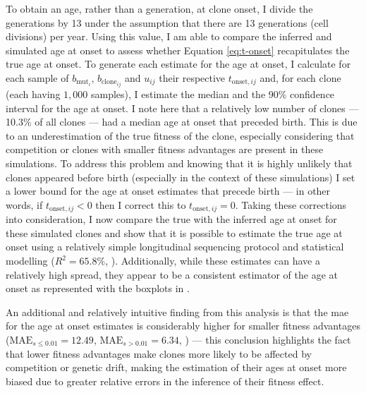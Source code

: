 To obtain an age, rather than a generation, at clone onset, I divide the generations by 13 under the assumption that there are 13 generations (cell divisions) per year. Using this value, I am able to compare the inferred and simulated age at onset to assess whether Equation \eqref{eq:t-onset} recapitulates the true age at onset. To generate each estimate for the age at onset, I calculate for each sample of $b_{\mathrm{mut}_i}$, $b_{\mathrm{clone}_{ij}}$ and $u_{ij}$ their respective $t_{\mathrm{onset},ij}$ and, for each clone (each having $1,000$ samples), I estimate the median and the 90\% confidence interval for the age at onset. I note here that a relatively low number of clones --- 10.3\% of all clones --- had a median age at onset that preceded birth. This is due to an underestimation of the true fitness of the clone, especially considering that competition or clones with smaller fitness advantages are present in these simulations. To address this problem and knowing that it is highly unlikely that clones appeared before birth (especially in the context of these simulations) I set a lower bound for the age at onset estimates that precede birth --- in other words, if $t_{\mathrm{onset},ij} < 0$ then I correct this to $t_{\mathrm{onset},ij}=0$. Taking these corrections into consideration, I now compare the true with the inferred age at onset for these simulated clones and show that it is possible to estimate the true age at onset using a relatively simple longitudinal sequencing protocol and statistical modelling ($R^2 = 65.8\%$, ). Additionally, while these estimates can have a relatively high spread, they appear to be a consistent estimator of the age at onset as represented with the boxplots in . 

\begin{figure}[!ht]
	\label{fig:age-at-onset-sim}
\end{figure}

An additional and relatively intuitive finding from this analysis is that the \ac{mae} for the age at onset estimates is considerably higher for smaller fitness advantages ($\mathrm{MAE}_{s \leq 0.01} = 12.49$, $\mathrm{MAE}_{s > 0.01} = 6.34$, ) --- this conclusion highlights the fact that lower fitness advantages make clones more likely to be affected by competition or genetic drift, making the estimation of their ages at onset more biased due to greater relative errors in the inference of their fitness effect. 

